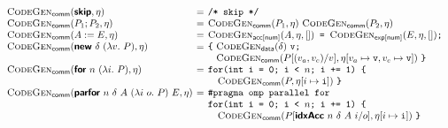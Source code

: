 \begin{figure}[H]
  \begin{minipage}{1.0\linewidth}
    \begin{displaymath}
      \begin{array}{l@{\hspace{0.4em}}c@{\hspace{0.4em}}l}
        \codegenComm{\prim{skip}, \eta}
        &=& \texttt{/* skip */}
        \\
        \codegenComm{P_1; P_2, \eta}
        &=& \begin{array}[t]{@{}l}
              \codegenComm{P_1, \eta}~\codegenComm{P_2, \eta}
            \end{array}
        \\
        \codegenComm{A := E, \eta}
        &=& \codegenAcc{\num}{A, \eta, []}\texttt{ = }\codegenExp{\num}{E, \eta, []}\texttt{;}
        \\
        \codegenComm{\prim{new}~\delta~(\lambda v.~P), \eta}
        &=& \texttt{\{}~
            \begin{array}[t]{@{}l}
              \codegenData{\delta}~\texttt{v;} \\
              \codegenComm{P[(v_a,v_e)/v], \eta[v_a \mapsto \texttt{v}, v_e \mapsto \texttt{v}]}\ \texttt{\}}
            \end{array}
        \\
        \codegenComm{\prim{for}~n~(\lambda i.~P), \eta}
        &=& \begin{array}[t]{@{}l}
              \texttt{for(int i = 0; i < $n$; i += 1) \{} \\
              \quad \codegenComm{P, \eta[i \mapsto \texttt{i}]} \ \texttt{\}}
            \end{array}
        \\
        \codegenComm{\prim{parfor}~n~\delta~A~(\lambda i~o.~P)~E, \eta}
        &=& \begin{array}[t]{@{}l}
              \texttt{\#pragma omp parallel for}\\
              \texttt{for(int i = 0; i < $n$; i += 1) \{ }\\
              \quad \codegenComm{P[\prim{idxAcc}~n~\delta~A~i/o], \eta[i \mapsto \texttt{i}]}\ \texttt{\}}
            \end{array}
      \end{array}
    \end{displaymath}
    \label{fig:codegen-comm}
  \end{minipage}


\end{figure}
